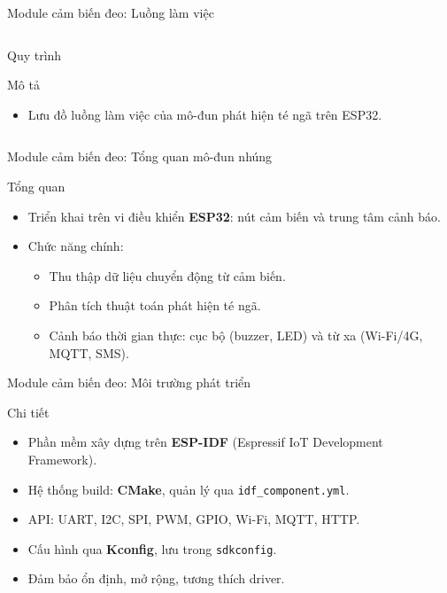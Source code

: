 \begin{frame}[fragile]{Module cảm biến đeo: Luồng làm việc}
\begin{columns}[t]
\begin{column}{0.4\textwidth}
\begin{block}{Quy trình}
\begin{itemize}
                \end{itemize}
            \end{block}
            \begin{block}{Mô tả}
                \begin{itemize}
                    \item Lưu đồ luồng làm việc của mô-đun phát hiện té ngã trên ESP32.
                \end{itemize}
            \end{block}
            \label{fig:module1_flow}
        \end{column}
    \end{columns}
\end{frame}

\begin{frame}{Module cảm biến đeo: Tổng quan mô-đun nhúng}
    \begin{block}{Tổng quan}
        \begin{itemize}
            \item Triển khai trên vi điều khiển \textbf{ESP32}: nút cảm biến và trung tâm cảnh báo.
            \item Chức năng chính:
            \begin{itemize}
                \item Thu thập dữ liệu chuyển động từ cảm biến.
                \item Phân tích thuật toán phát hiện té ngã.
                \item Cảnh báo thời gian thực: cục bộ (buzzer, LED) và từ xa (Wi-Fi/4G, MQTT, SMS).
            \end{itemize}
        \end{itemize}
    \end{block}
\end{frame}

\begin{frame}{Module cảm biến đeo: Môi trường phát triển}
    \begin{block}{Chi tiết}
        \begin{itemize}
            \item Phần mềm xây dựng trên \textbf{ESP-IDF} (Espressif IoT Development Framework).
            \item Hệ thống build: \textbf{CMake}, quản lý qua \texttt{idf\_component.yml}.
            \item API: UART, I2C, SPI, PWM, GPIO, Wi-Fi, MQTT, HTTP.
            \item Cấu hình qua \textbf{Kconfig}, lưu trong \texttt{sdkconfig}.
            \item Đảm bảo ổn định, mở rộng, tương thích driver.
        \end{itemize}
    \end{block}
\end{frame}

